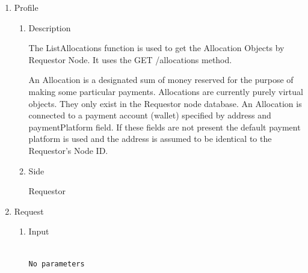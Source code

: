 \newpage



\begin{enumerate}

\item Profile

\begin{enumerate}

\item Description

The ListAllocations function is used to get the Allocation Objects by Requestor Node. 
It uses the GET /allocations method.

An Allocation is a designated sum of money reserved for the purpose of making some particular payments. 
Allocations are currently purely virtual objects. They only exist in the Requestor node database.
An Allocation is connected to a payment account (wallet) specified by address and paymentPlatform field. 
If these fields are not present the default payment platform is used and the address is assumed 
to be identical to the Requestor's Node ID.

 
\item Side

Requestor

\end{enumerate}

\item Request

\begin{enumerate}

\item Input

\begin{tcolorbox}[boxrule=0pt, frame empty]
\begin{verbatim}

No parameters

\end{verbatim}
\end{tcolorbox}



\end{enumerate}
\end{enumerate}
